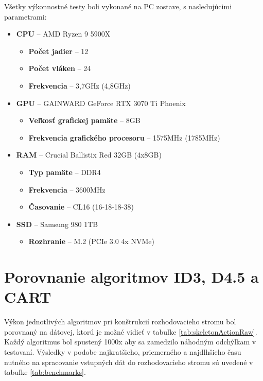 \documentclass[slovak, master]{diploma}
\begin{document}
Všetky výkonnostné testy boli vykonané na PC zostave, s nasledujúcimi parametrami:
\begin{itemize}
    \item \textbf{CPU} -- AMD Ryzen 9 5900X
    \begin{itemize}
        \item \textbf{Počet jadier} -- 12
        \item \textbf{Počet vláken} -- 24
        \item \textbf{Frekvencia} -- 3,7GHz (4,8GHz)
    \end{itemize}
    \item \textbf{GPU} -- GAINWARD GeForce RTX 3070 Ti Phoenix
    \begin{itemize}
        \item \textbf{Veľkosť grafickej pamäte} -- 8GB
        \item \textbf{Frekvencia grafického procesoru} -- 1575MHz (1785MHz)
    \end{itemize}
    \item \textbf{RAM} -- Crucial Ballistix Red 32GB (4x8GB)
    \begin{itemize}
        \item \textbf{Typ pamäte} -- DDR4
        \item \textbf{Frekvencia} -- 3600MHz
        \item \textbf{Časovanie} -- CL16 (16-18-18-38)
    \end{itemize}
    \item \textbf{SSD} -- Samsung 980 1TB
    \begin{itemize}
        \item \textbf{Rozhranie} -- M.2 (PCIe 3.0 4x NVMe)
    \end{itemize}
\end{itemize}

\section{Porovnanie algoritmov ID3, D4.5 a CART}
\label{sec:id3d45cart}
Výkon jednotlivých algoritmov pri konštrukcií rozhodovacieho stromu bol porovnaný na dátovej, ktorú je možné vidieť v tabuľke \ref{tab:skeletonActionRaw}. Každý algoritmus bol spustený 1000x aby sa zamedzilo náhodným odchýlkam v testovaní. Výsledky v podobe najkratšieho, priemerného a najdlhšieho času nutného na spracovanie vstupných dát do rozhodovacieho stromu sú uvedené v tabuľke \ref{tab:benchmarks}.
\end{document}
